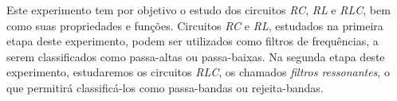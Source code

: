 Este experimento tem por objetivo o estudo dos circuitos \textit{RC}, \textit{RL} e \textit{RLC}, bem como suas propriedades e funções. Circuitos \textit{RC} e \textit{RL}, estudados na primeira etapa deste experimento, podem ser utilizados como filtros de frequências, a serem classificados como passa-altas ou passa-baixas. Na segunda etapa deste experimento, estudaremos os circuitos \textit{RLC}, os chamados \textit{filtros ressonantes}, o que permitirá classificá-los como passa-bandas ou rejeita-bandas.
